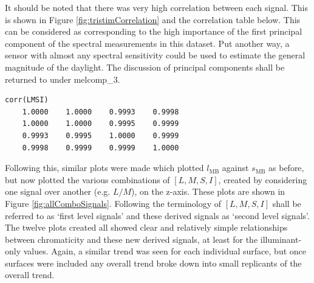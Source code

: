 It should be noted that there was very high correlation between each signal. This is shown in Figure \ref{fig:tristimCorrelation} and the correlation table below. This can be considered as corresponding to the high importance of the first principal component of the spectral measurements in this dataset. Put another way, a sensor with almost any spectral sensitivity could be used to estimate the general magnitude of the daylight. The discussion of principal components shall be returned to under melcomp\_3.

\begin{lstlisting}
corr(LMSI)
    1.0000    1.0000    0.9993    0.9998
    1.0000    1.0000    0.9995    0.9999
    0.9993    0.9995    1.0000    0.9999
    0.9998    0.9999    0.9999    1.0000
\end{lstlisting}

\bigskip

Following this, similar plots were made which plotted $l_{\text{MB}}$ against $s_{\text{MB}}$ as before, but now plotted the various combinations of $[L,M,S,I]$, created by considering one signal over another (e.g. $L/M$), on the z-axis. These plots are shown in Figure \ref{fig:allComboSignals}. Following the terminology of \citet{barrionuevo_contributions_2014} $[L,M,S,I]$ shall be referred to as `first level signals' and these derived signals as `second level signals'. The twelve plots created all showed clear and relatively simple relationships between chromaticity and these new derived signals, at least for the illuminant-only values. Again, a similar trend was seen for each individual surface, but once surfaces were included any overall trend broke down into small replicants of the overall trend.

% 



